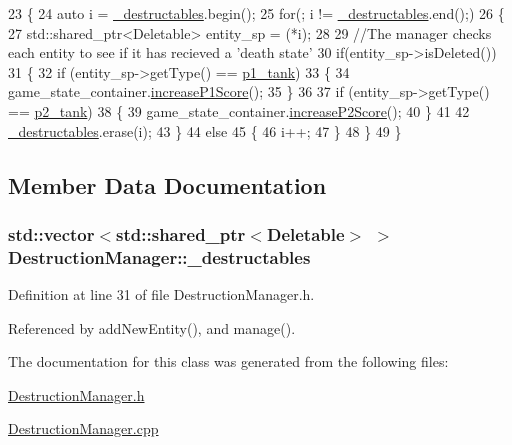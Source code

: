 \begin{DoxyCode}
23 \{
24     \textcolor{keyword}{auto} i = \hyperlink{classDestructionManager_a4abb9d43e2508c82519e0fedde734670}{\_destructables}.begin();
25     \textcolor{keywordflow}{for}(; i != \hyperlink{classDestructionManager_a4abb9d43e2508c82519e0fedde734670}{\_destructables}.end();)
26     \{
27             std::shared\_ptr<Deletable> entity\_sp = (*i);
28 
29             \textcolor{comment}{//The manager checks each entity to see if it has recieved a 'death state'}
30             \textcolor{keywordflow}{if}(entity\_sp->isDeleted())
31             \{
32                 \textcolor{keywordflow}{if} (entity\_sp->getType() == \hyperlink{Structures_8h_a6d8f83e710b27d4f86c45f0bb77066e3a31fa78b2b7dd774f5158a16ef230932e}{p1\_tank})
33                 \{
34                     game\_state\_container.\hyperlink{classGameStateData_a28ec2cf2d7dd89bab394b611a83e7d4c}{increaseP1Score}();
35                 \}
36 
37                 \textcolor{keywordflow}{if} (entity\_sp->getType() == \hyperlink{Structures_8h_a6d8f83e710b27d4f86c45f0bb77066e3a3d48d62c7b88e7ee171698fe56dc9e59}{p2\_tank})
38                 \{
39                     game\_state\_container.\hyperlink{classGameStateData_a8b2470bafedd2c51cdc32199ae004b13}{increaseP2Score}();
40                 \}
41 
42                 \hyperlink{classDestructionManager_a4abb9d43e2508c82519e0fedde734670}{\_destructables}.erase(i);
43             \}
44             \textcolor{keywordflow}{else}
45             \{
46                 i++;
47             \}
48     \}
49 \}
\end{DoxyCode}


\subsection{Member Data Documentation}
\hypertarget{classDestructionManager_a4abb9d43e2508c82519e0fedde734670}{
\subsubsection[{\-\_\-destructables}]{\setlength{\rightskip}{0pt plus 5cm}std\-::vector$<$std\-::shared\-\_\-ptr$<${\bf Deletable}$>$ $>$ Destruction\-Manager\-::\-\_\-destructables\hspace{0.3cm}{\ttfamily [private]}}}\label{classDestructionManager_a4abb9d43e2508c82519e0fedde734670}


Definition at line 31 of file Destruction\-Manager.\-h.



Referenced by add\-New\-Entity(), and manage().



The documentation for this class was generated from the following files\-:\begin{DoxyCompactItemize}
\item 
\hyperlink{DestructionManager_8h}{Destruction\-Manager.\-h}\item 
\hyperlink{DestructionManager_8cpp}{Destruction\-Manager.\-cpp}\end{DoxyCompactItemize}
